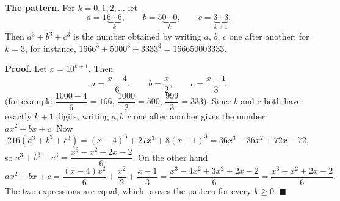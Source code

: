 \textbf{The pattern.} For $k=0,1,2,\dots$ let
\[
a=1\underbrace{6\cdots6}_{k},\qquad b=5\underbrace{0\cdots0}_{k},\qquad c=\underbrace{3\cdots3}_{k+1}.
\]
Then $a^3+b^3+c^3$ is the number obtained by writing $a$, $b$, $c$ one after another; for $k=3$, for instance, $1666^3+5000^3+3333^3=166650003333$.

\textbf{Proof.} Let $x=10^{k+1}$. Then
\[
a=\dfrac{x-4}{6},\qquad b=\dfrac {x}{2},\qquad c=\dfrac{x-1}{3}
\]
(for example $\dfrac{1000-4}{6}=166$, $\dfrac{1000}{2}=500$, $\dfrac{999}{3}=333$). Since $b$ and $c$ both have exactly $k+1$ digits, writing $a,b,c$ one after another gives the number $ax^2+bx+c$. Now
\[
216\left(a^3+b^3+c^3\right)=(x-4)^3+27x^3+8(x-1)^3=36x^3-36x^2+72x-72,
\]
so $a^3+b^3+c^3=\dfrac{x^3-x^2+2x-2}{6}$. On the other hand
\[
ax^2+bx+c=\dfrac{(x-4)x^2}{6}+\dfrac{x^2}{2}+\dfrac{x-1}{3}=\dfrac{x^3-4x^2+3x^2+2x-2}{6}=\dfrac{x^3-x^2+2x-2}{6}.
\]
The two expressions are equal, which proves the pattern for every $k\ge0$. $\blacksquare$
